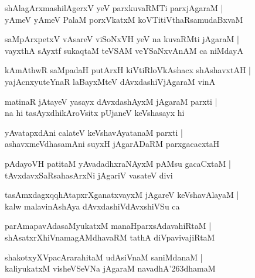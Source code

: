 \documentclass[twoside,12pt,openright]{book}
\def\S{\char'263}
\newcounter{shloka}[chapter]
\begin{document}
\begin{shloka}%
shAlagArxmashilAgerxV yeV parxkuvaRMTi parxjAgaraM |\\
yAmeV yAmeV PalaM porxVkatxM koVTitiVthaRsamudaBxvaM 
\end{shloka}

\begin{shloka}%
saMpArxpetxV vAsareV viSoNxVH yeV na kuvaRMti jAgaraM |\\
vayxthA sAyxtf sukaqtaM teVSAM veYSaNxvAnAM ca niMdayA 
\end{shloka}

\begin{shloka}%
kAmAthwR saMpadaH putArxH kiVtiRloVkAshacx shAshavxtAH |\\
yajAcnxyuteYnaR laBayxMteV dAvxdashiVjAgaraM vinA
\end{shloka}

\begin{shloka}%
matinaR jAtayeV yasayx dAvxdashAyxM jAgaraM parxti |\\
na hi tasAyxdhikAroVsitx pUjaneV keVshasayx hi 
\end{shloka}

\begin{shloka}%
yAvatapxdAni calateV keVshavAyatanaM parxti |\\
ashavxmeVdhasamAni suyxH jAgarADaRM parxgacacxtaH
\end{shloka}

\begin{shloka}%
pAdayoVH patitaM yAvadadhxraNAyxM pAMsu gacaCxtaM |\\
tAvxdavxSaRsahasArxNi jAgariV vasateV divi
\end{shloka}

\begin{shloka}%
tasAmxdagxqqhAtapxrXganatxvayxM jAgareV keVshavAlayaM |\\
kalw malavinAshAya dAvxdashiVdAvxshiVSu ca 
\end{shloka}

\begin{shloka}%
parAmapavAdasaMyukatxM manaHparxsAdavahiRtaM |\\
shAsatxrXhiVnamagAMdhavaRM tathA diVpavivajiRtaM
\end{shloka}

\begin{shloka}%
shakotxyXVpacArarahitaM udAsiVnaM saniMdanaM |\\
kaliyukatxM visheVSeVNa jAgaraM navadhA\S dhamaM 
\end{shloka}
\end{document}
